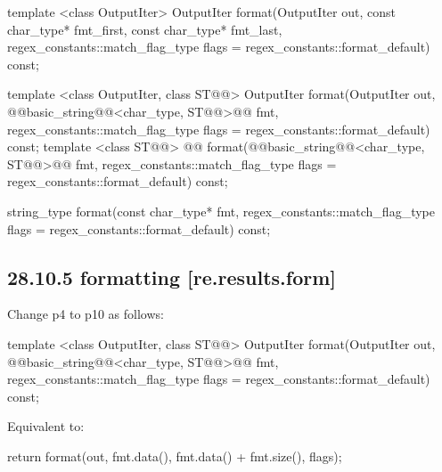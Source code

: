 \documentclass[ebook,11pt,article]{memoir}
\begin{document}
\begin{removedblock}
\begin{codeblock}
     template <class OutputIter>
      OutputIter
      format(OutputIter out,
             const char_type* fmt_first, const char_type* fmt_last,
             regex_constants::match_flag_type flags =
              regex_constants::format_default) const;
\end{codeblock}
\end{removedblock}
\begin{codeblock}
     template <class OutputIter, class ST@@>
       OutputIter
       format(OutputIter out,
              @@basic_string@@<char_type, ST@@>@\del{\&}@ fmt,
              regex_constants::match_flag_type flags =
                regex_constants::format_default) const;
     template <class ST@@>
      @@
      format(@@basic_string@@<char_type, ST@@>@\del{\&}@ fmt,
             regex_constants::match_flag_type flags =
               regex_constants::format_default) const;
\end{codeblock}
\begin{removedblock}
\begin{codeblock}               
     string_type
     format(const char_type* fmt,
            regex_constants::match_flag_type flags =
              regex_constants::format_default) const;


\end{codeblock}
\end{removedblock}

\subsection{28.10.5  formatting [re.results.form]}
Change p4 to p10 as follows:
\begin{itemdecl}
template <class OutputIter, class ST@@>
  OutputIter format(OutputIter out,
              @@basic_string@@<char_type, ST@@>@\del{\&}@ fmt,
                    regex_constants::match_flag_type flags =
                      regex_constants::format_default) const;
\end{itemdecl}

\begin{itemdescr}
\pnum
\effects Equivalent to:
\begin{codeblock}
return format(out, fmt.data(), fmt.data() + fmt.size(), flags);
\end{codeblock}
\end{itemdescr}
\end{document}
